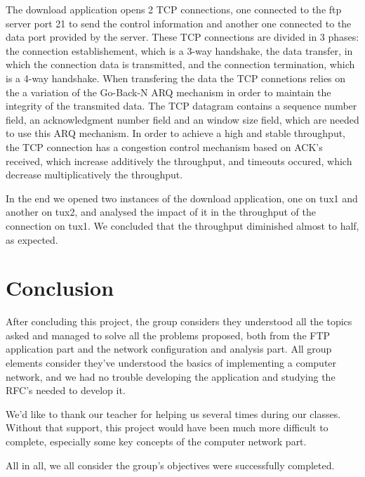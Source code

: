 \documentclass[11pt,a4paper,reqno]{article}
\numberwithin{equation}{section}
\begin{document}
The download application opens 2 TCP connections, one connected to the ftp server port 21 to send the control information and another one connected to the data port provided by the server. These TCP connections are divided in 3 phases: the connection establishement, which is a 3-way handshake, the data transfer, in which the connection data is transmitted, and the connection termination, which is a 4-way handshake. When transfering the data the TCP connetions relies on the a variation of the Go-Back-N ARQ mechanism in order to maintain the integrity of the transmited data. The TCP datagram contains a sequence number field, an acknowledgment number field and an window size field, which are needed to use this ARQ mechanism. In order to achieve a high and stable throughput, the TCP connection has a congestion control mechanism based on ACK’s received, which increase additively the throughput, and timeouts occured, which decrease multiplicatively the throughput.

In the end we opened two instances of the download application, one on tux1 and another on tux2, and analysed the impact of it in the throughput of the connection on tux1. We concluded that the throughput diminished almost to half, as expected.

\section{Conclusion}

After concluding this project, the group considers they understood all the topics asked and managed to solve all the problems proposed, both from the FTP application part and the network configuration and analysis part. All group elements consider they've understood the basics of implementing a computer network, and we had no trouble developing the application and studying the RFC's needed to develop it. 

We'd like to thank our teacher for helping us several times during our classes. Without that support, this project would have been much more difficult to complete, especially some key concepts of the computer network part.

All in all, we all consider the group's objectives were successfully completed.

\newpage
\end{document}
